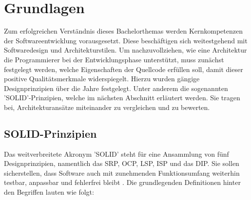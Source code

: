 

\chapter{Grundlagen}

Zum erfolgreichen Verständnis dieses Bachelorthemas werden Kernkompetenzen der Softwareentwicklung vorausgesetzt. Diese beschäftigen sich weitestgehend mit Softwaredesign und Architekturstilen. Um nachzuvollziehen, wie eine Architektur die Programmierer bei der Entwicklungsphase unterstützt, muss zunächst festgelegt werden, welche Eigenschaften der Quellcode erfüllen soll, damit dieser positive Qualitätsmerkmale widerspiegelt. Hierzu wurden gängige Designprinzipien über die Jahre festgelegt. Unter anderem die sogenannten 'SOLID'-Prinzipien, welche im nächsten Abschnitt erläutert werden. Sie tragen bei, Architekturansätze miteinander zu vergleichen und zu bewerten.

\section{SOLID-Prinzipien}

Das weitverbreitete Akronym 'SOLID' steht für eine Ansammlung von fünf Designprinzipien, namentlich das \acrfull{SRP}, \acrfull{OCP}, \acrfull{LSP}, \acrfull{ISP} und das \acrfull{DIP}. Sie sollen sicherstellen, dass Software auch mit zunehmenden Funktionsumfang weiterhin testbar, anpassbar und fehlerfrei bleibt \cite{Martin.2000, Martin.2018}. Die grundlegenden Definitionen hinter den Begriffen lauten wie folgt:


